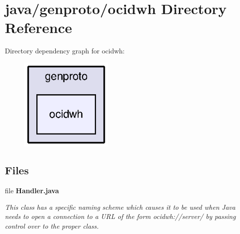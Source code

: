 \section{java/genproto/ocidwh Directory Reference}
\label{dir_50e20d61f67e286b4715d2e1bc365b76}
Directory dependency graph for ocidwh\+:\nopagebreak
\begin{figure}[H]
\begin{center}
\leavevmode
\includegraphics[width=130pt]{dir_50e20d61f67e286b4715d2e1bc365b76_dep}
\end{center}
\end{figure}
\subsection*{Files}
\begin{DoxyCompactItemize}
\item 
file {\bf Handler.\+java}
\begin{DoxyCompactList}\small\item\em This class has a specific naming scheme which causes it to be used when Java needs to open a connection to a U\+R\+L of the form ocidwh\+://server/ by passing control over to the proper class. \end{DoxyCompactList}\end{DoxyCompactItemize}
